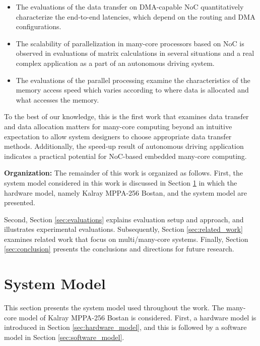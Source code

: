 \documentclass[conference,compsoc]{IEEEtran}
\newcommand{\comment}[1]{}
\begin{document}
\vspace{-3mm}
\begin{itemize}
\setlength{\leftskip}{-5mm}
\item The evaluations of the data transfer on DMA-capable NoC quantitatively characterize the end-to-end latencies, which depend on the routing and DMA configurations.
\item The scalability of parallelization in many-core processors based on NoC is observed in evaluations of matrix calculations in several situations and a real complex application as a part of an autonomous driving system.
\item The evaluations of the parallel processing examine the characteristics of the memory access speed which varies according to where data is allocated and what accesses the memory.
\end{itemize}
\vspace{-3mm}

To the best of our knowledge, this is the first work that examines data transfer and data allocation matters for many-core computing beyond an intuitive expectation to allow system designers to choose appropriate data transfer methods.
Additionally, the speed-up result of autonomous driving application indicates a practical potential for NoC-based embedded many-core computing.
\comment{1-8, 1-9}

\textbf{Organization:}
The remainder of this work is organized as follows.
First, the system model considered in this work is discussed in Section \ref{sec:system_model} in which the hardware model, namely Kalray MPPA-256 Bostan, and the system model are presented.
\comment{1-10}
Second, Section \ref{sec:evaluations} explains evaluation setup and approach, and illustrates experimental evaluations.
Subsequently, Section \ref{sec:related_work} examines related work that focus on multi/many-core systems.
Finally, Section \ref{sec:conclusion} presents the conclusions and directions for future research.


\vspace{-4mm}
\section{System Model}
\label{sec:system_model}
\vspace{-4mm}
This section presents the system model used throughout the work.
The many-core model of Kalray MPPA-256 Bostan is considered.
First, a hardware model is introduced in Section \ref{sec:hardware_model}, and this is followed by a software model in Section \ref{sec:software_model}.
\end{document}
